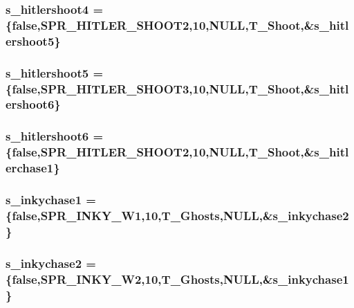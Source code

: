 \label{WL__ACT2_8C_aa7eb2f5b42eac804651a502215491e57}
\hypertarget{WL__ACT2_8C_a5786ccbe2530dcb569a71652a853c5b4}{
\subsubsection[{s\_\-hitlershoot4}]{ {\bf s\_\-hitlershoot4} = \{false,SPR\_\-HITLER\_\-SHOOT2,10,NULL,T\_\-Shoot,\&{\bf s\_\-hitlershoot5}\}}}
\label{WL__ACT2_8C_a5786ccbe2530dcb569a71652a853c5b4}
\hypertarget{WL__ACT2_8C_a3d98a48b636846fed366ace0fffb3cf7}{
\subsubsection[{s\_\-hitlershoot5}]{ {\bf s\_\-hitlershoot5} = \{false,SPR\_\-HITLER\_\-SHOOT3,10,NULL,T\_\-Shoot,\&{\bf s\_\-hitlershoot6}\}}}
\label{WL__ACT2_8C_a3d98a48b636846fed366ace0fffb3cf7}
\hypertarget{WL__ACT2_8C_a07a879b13567eaeb79ac350414f4952a}{
\subsubsection[{s\_\-hitlershoot6}]{ {\bf s\_\-hitlershoot6} = \{false,SPR\_\-HITLER\_\-SHOOT2,10,NULL,T\_\-Shoot,\&{\bf s\_\-hitlerchase1}\}}}
\label{WL__ACT2_8C_a07a879b13567eaeb79ac350414f4952a}
\hypertarget{WL__ACT2_8C_afade892255b75dc0ab582ffaed0e17d8}{
\subsubsection[{s\_\-inkychase1}]{ {\bf s\_\-inkychase1} = \{false,SPR\_\-INKY\_\-W1,10,T\_\-Ghosts,NULL,\&{\bf s\_\-inkychase2}\}}}
\label{WL__ACT2_8C_afade892255b75dc0ab582ffaed0e17d8}
\hypertarget{WL__ACT2_8C_ad357c8f3bb6a71e213ab45fd06f67489}{
\subsubsection[{s\_\-inkychase2}]{ {\bf s\_\-inkychase2} = \{false,SPR\_\-INKY\_\-W2,10,T\_\-Ghosts,NULL,\&{\bf s\_\-inkychase1}\}}}

